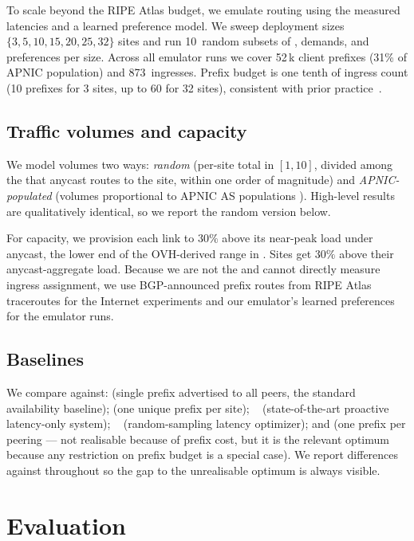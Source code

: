 \documentclass[acmsmall,anonymous,review,nonacm,10pt]{acmart}
\begin{document}
  To scale beyond the RIPE Atlas budget, we
emulate routing using the measured latencies and a learned
preference model.  We sweep deployment sizes
$\{3,5,10,15,20,25,32\}$ sites and run 10~random subsets of
\ugs, demands, and preferences per size.  Across all emulator
runs we cover 52\,k client prefixes (31\% of APNIC population)
and 873~ingresses.  Prefix budget is one tenth of ingress count
(10 prefixes for 3 sites, up to 60 for 32 sites), consistent with
prior practice~\cite{anyopt,painter}.

\subsection{Traffic volumes and capacity}

We model \ug volumes two ways: \emph{random} (per-site total
in $[1,10]$, divided among the \ugs that anycast routes to the
site, within one order of magnitude) and \emph{APNIC-populated}
(volumes proportional to APNIC AS populations
\cite{apnic_pop_est,loqman-apnic}).  High-level results are
qualitatively identical, so we report the random version below.

For capacity, we provision each link to $30\%$ above its
near-peak load under anycast, the lower end of the OVH-derived
range in .  Sites get $30\%$ above their
anycast-aggregate load.  Because we are not the \servprod and
cannot directly measure ingress assignment, we use BGP-announced
prefix routes from RIPE Atlas traceroutes for the Internet
experiments and our emulator's learned preferences for the
emulator runs.

\subsection{Baselines}

We compare \sparse against:
\acast (single prefix advertised to all peers, the standard
availability baseline);
\ucast (one unique prefix per site);
\painter~\cite{painter} (state-of-the-art proactive latency-only system);
\anyopt~\cite{anyopt} (random-sampling latency optimizer); and
\expensive (one prefix per peering --- not realisable because of
prefix cost, but it is the relevant optimum because any restriction
on prefix budget is a special case).  We report differences against
\expensive throughout so the gap to the unrealisable optimum is
always visible.

\section{Evaluation}
\label{sec:evaluation}
\end{document}
